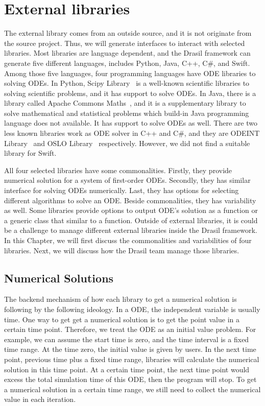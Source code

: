 \chapter{External libraries}
The external library comes from an outside source, and it is not originate from the source project. Thus, we will generate interfaces to interact with selected libraries. Most libraries are language dependent, and the Drasil framework can generate five different languages, includes Python, Java, C++, C\#, and Swift. Among those five languages, four programming languages have ODE libraries to solving ODEs. In Python, Scipy Library~\citep{scipy} is a well-known scientific libraries to solving scientific problems, and it has support to solve ODEs. In Java, there is a library called Apache Commons Maths~\citep{apache}, and it is a supplementary library to solve mathematical and statistical problems which build-in Java programming language does not available. It has support to solve ODEs as well. There are two less known libraries work as ODE solver in C++ and C\#, and they are ODEINT Library~\citep{odeint} and OSLO Library~\citep{oslo} respectively. However, we did not find a suitable library for Swift. 

All four selected libraries have some commonalities. Firstly, they provide numerical solution for a system of first-order ODEs. Secondly, they has similar interface for solving ODEs numerically. Last, they has options for selecting different algorithms to solve an ODE. Beside commonalities, they has variability as well. Some libraries provide options to output ODE's solution as a function or a generic class that similar to a function. Outside of external libraries, it is could be a challenge to manage different external libraries inside the Drasil framework. In this Chapter, we will first discuss the commonalities and variabilities of four libraries. Next, we will discuss how the Drasil team manage those libraries.

\section{Numerical Solutions}
The backend mechanism of how each library to get a numerical solution is following by the following ideology. In a ODE, the independent variable is usually time. One way to get get a numerical solution is to get the point value in a certain time point. Therefore, we treat the ODE as an initial value problem. For example, we can assume the start time is zero, and the time interval is a fixed time range. At the time zero, the initial value is given by users. In the next time point, previous time plus a fixed time range, libraries will calculate the numerical solution in this time point. At a certain time point, the next time point would excess the total simulation time of this ODE, then the program will stop. To get a numerical solution in a certain time range, we still need to collect the numerical value in each iteration. 

